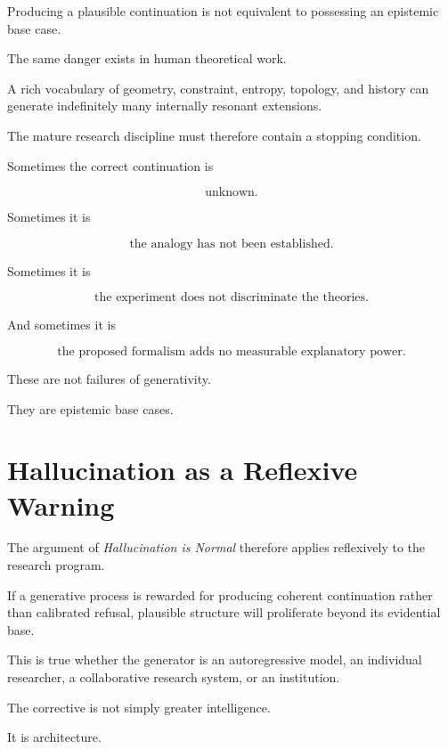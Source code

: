 \documentclass[11pt]{article}
\theoremstyle{remark}
\begin{document}
Producing a plausible continuation is not equivalent to possessing an
epistemic base case.

The same danger exists in human theoretical work.

A rich vocabulary of geometry, constraint, entropy, topology, and history can
generate indefinitely many internally resonant extensions.

The mature research discipline must therefore contain a stopping condition.

Sometimes the correct continuation is

\begin{equation}
\text{unknown}.
\end{equation}

Sometimes it is

\begin{equation}
\text{the analogy has not been established}.
\end{equation}

Sometimes it is

\begin{equation}
\text{the experiment does not discriminate the theories}.
\end{equation}

And sometimes it is

\begin{equation}
\text{the proposed formalism adds no measurable explanatory power}.
\end{equation}

These are not failures of generativity.

They are epistemic base cases.

\section{Hallucination as a Reflexive Warning}

The argument of \emph{Hallucination is Normal} therefore applies reflexively to
the research program.

If a generative process is rewarded for producing coherent continuation rather
than calibrated refusal, plausible structure will proliferate beyond its
evidential base.

This is true whether the generator is an autoregressive model, an individual
researcher, a collaborative research system, or an institution.

The corrective is not simply greater intelligence.

It is architecture.
\end{document}
